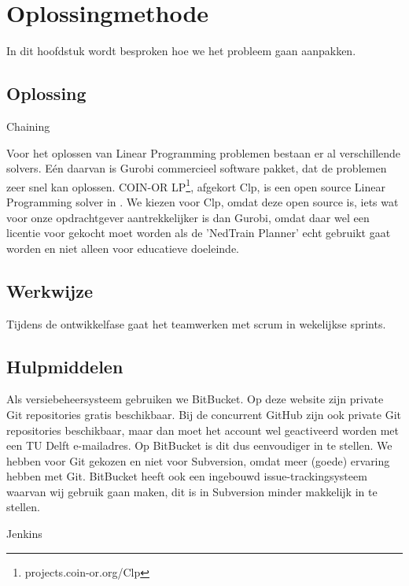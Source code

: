 \section{Oplossingmethode}
In dit hoofdstuk wordt besproken hoe we het probleem gaan aanpakken. 

\subsection{Oplossing}
Chaining

Voor het oplossen van Linear Programming problemen bestaan er al verschillende solvers. E\'en daarvan is Gurobi commercieel software pakket, dat de problemen zeer snel kan oplossen. COIN-OR LP\footnote{projects.coin-or.org/Clp}, afgekort Clp, is een open source Linear Programming solver in \cpp . We kiezen voor Clp, omdat deze open source is, iets wat voor onze opdrachtgever aantrekkelijker is dan Gurobi, omdat daar wel een licentie voor gekocht moet worden als de 'NedTrain Planner' echt gebruikt gaat worden en niet alleen voor educatieve doeleinde. 

\subsection{Werkwijze}
Tijdens de ontwikkelfase gaat het teamwerken met scrum in wekelijkse sprints. 

\subsection{Hulpmiddelen}
Als versiebeheersysteem gebruiken we BitBucket. Op deze website zijn private Git repositories gratis beschikbaar. Bij de concurrent GitHub zijn ook private Git repositories beschikbaar, maar dan moet het account wel geactiveerd worden met een TU Delft e-mailadres. Op BitBucket is dit dus eenvoudiger in te stellen. We hebben voor Git gekozen en niet voor Subversion, omdat meer (goede) ervaring hebben met Git. BitBucket heeft ook een ingebouwd issue-trackingsysteem waarvan wij gebruik gaan maken, dit is in Subversion minder makkelijk in te stellen.

Jenkins
